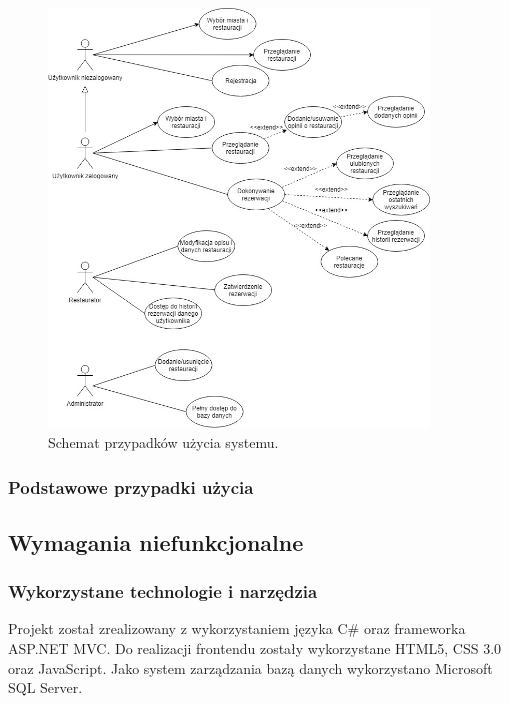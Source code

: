 \documentclass{article}
\begin{document}
\begin{figure}
\centering
	\includegraphics[width=0.90\textwidth]{use_case.jpg}
	\caption{Schemat przypadków użycia systemu.}
\end{figure}

\subsubsection{Podstawowe przypadki użycia}



\subsection{Wymagania niefunkcjonalne}

\subsubsection{Wykorzystane technologie i narzędzia}

Projekt został zrealizowany z wykorzystaniem języka C\# oraz frameworka ASP.NET MVC. Do realizacji frontendu zostały wykorzystane HTML5, CSS 3.0 oraz JavaScript. Jako system zarządzania bazą danych wykorzystano Microsoft SQL Server.
\end{document}
